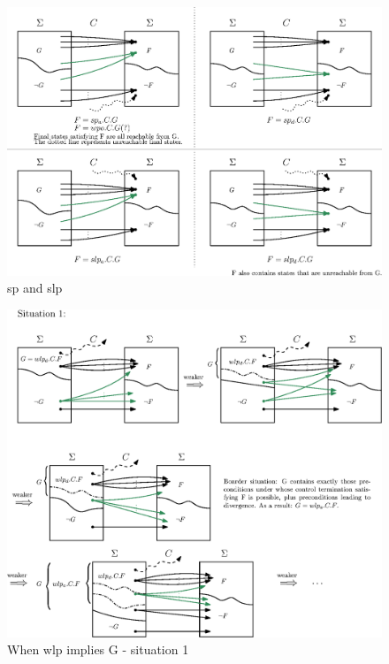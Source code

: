 \begin{figure}[ht!]\centering
\includegraphics[width=\textwidth]{image/sp-slp.eps}
\caption{sp and slp}
\label{fig:sp-slp}
\end{figure}


\begin{figure}[ht!]\centering
\includegraphics[width=\textwidth]{image/wlp-g-1.eps}
\caption{When wlp implies G - situation 1}
\label{fig:wlp-g-1}
\end{figure}

